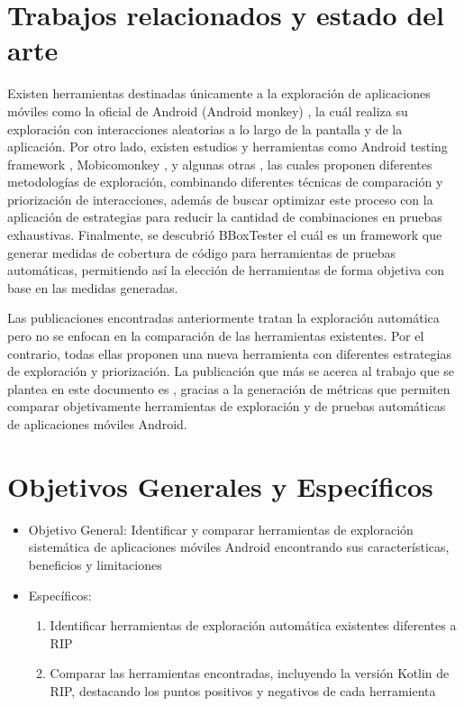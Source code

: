 \documentclass[conference]{IEEEtran}
\begin{document}
\section{Trabajos relacionados y estado del arte}
Existen herramientas destinadas únicamente a la exploración de aplicaciones móviles como la oficial de Android (Android monkey) \cite{b1}, la cuál realiza su exploración con interacciones aleatorias a lo largo de la pantalla y de la aplicación. Por otro lado, existen estudios y herramientas como Android testing framework \cite{b2}, Mobicomonkey \cite{b3}, y algunas otras \cite{b4, b5, b6}, las cuales proponen diferentes metodologías de exploración, combinando diferentes técnicas de comparación y priorización de interacciones, además de buscar optimizar este proceso con la aplicación de estrategias para reducir la cantidad de combinaciones en pruebas exhaustivas. Finalmente, se descubrió BBoxTester \cite{b7} el cuál es un framework que generar medidas de cobertura de código para herramientas de pruebas automáticas, permitiendo así la elección de herramientas de forma objetiva con base en las medidas generadas.

Las publicaciones encontradas anteriormente tratan la exploración automática pero no se enfocan en la comparación de las herramientas existentes. Por el contrario, todas ellas proponen una nueva herramienta con diferentes estrategias de exploración y priorización. La publicación que más se acerca al trabajo que se plantea en este documento es \cite{b7}, gracias a la generación de métricas que permiten comparar objetivamente herramientas de exploración y de pruebas automáticas de aplicaciones móviles Android.

\section{Objetivos Generales y Específicos}
\begin{itemize}
	\item Objetivo General:
		Identificar y comparar herramientas de exploración sistemática de aplicaciones móviles Android encontrando sus características, beneficios y limitaciones
	\item Específicos:
		\begin{enumerate}
			\item Identificar herramientas de exploración automática existentes diferentes a RIP
			\item Comparar las herramientas encontradas, incluyendo la versión Kotlin de RIP, destacando los puntos positivos y negativos de cada herramienta
		\end{enumerate}
\end{itemize}
\end{document}
